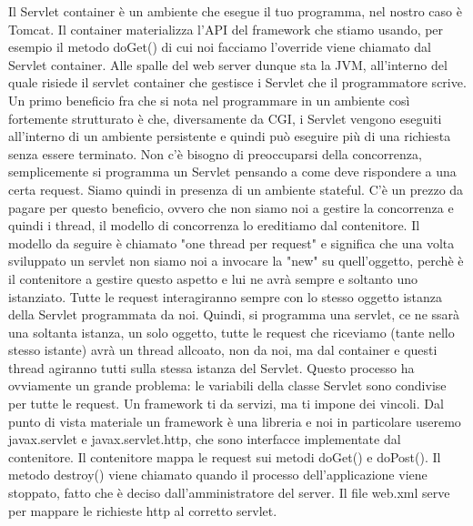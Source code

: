Il Servlet container è un ambiente che esegue il tuo programma, nel nostro caso è Tomcat. Il container materializza l'API del framework che stiamo usando, per esempio il metodo doGet() di cui noi facciamo l'override viene chiamato dal Servlet container.\newline
Alle spalle del web server dunque sta la JVM, all'interno del quale risiede il servlet container che gestisce i Servlet che il programmatore scrive.\newline
Un primo beneficio fra che si nota nel programmare in un ambiente così fortemente strutturato è che, diversamente da CGI, i Servlet vengono eseguiti all'interno di un ambiente persistente e quindi può eseguire più di una richiesta senza essere terminato. Non c'è bisogno di preoccuparsi della concorrenza, semplicemente si programma un Servlet pensando a come deve rispondere a una certa request. Siamo quindi in presenza di un ambiente stateful. C'è un prezzo da pagare per questo beneficio, ovvero che non siamo noi a gestire la concorrenza e quindi i thread, il modello di concorrenza lo ereditiamo dal contenitore. Il modello da seguire è chiamato "one thread per request" e significa che una volta sviluppato un servlet non siamo noi a invocare la "new" su quell'oggetto, perchè è il contenitore a gestire questo aspetto e lui ne avrà sempre e soltanto uno istanziato. Tutte le request interagiranno sempre con lo stesso oggetto istanza della Servlet programmata da noi. Quindi, si programma una servlet, ce ne ssarà una soltanta istanza, un solo oggetto, tutte le request che riceviamo (tante nello stesso istante) avrà un thread allcoato, non da noi, ma dal container e questi thread agiranno tutti sulla stessa istanza del Servlet. Questo processo ha ovviamente un grande problema: le variabili della classe Servlet sono condivise per tutte le request.\newline
Un framework ti da servizi, ma ti impone dei vincoli.\newline
Dal punto di vista materiale un framework è una libreria e noi in particolare useremo javax.servlet e javax.servlet.http, che sono interfacce implementate dal contenitore.\newline
Il contenitore mappa le request sui metodi doGet() e doPost().\newline
Il metodo destroy() viene chiamato quando il processo dell'applicazione viene stoppato, fatto che è deciso dall'amministratore del server.\newline
Il file web.xml serve per mappare le richieste http al corretto servlet.\newline
